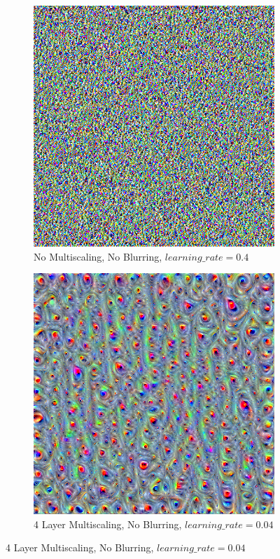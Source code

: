 \begin{figure}
    \captionsetup{justification=centering}
    
    \begin{subfigure}[t]{0.31\textwidth}
        \captionsetup{justification=centering}
        \centering
        \includegraphics[width=.7\linewidth]{figuras/feat_vis/experiments/intermediary/l6/random_image_pl1_lr4e-1_layer12_no-blur.png}
        \caption{No Multiscaling, No Blurring, \(learning\_rate = 0.4\)}
    \end{subfigure}
    \hfill
    \begin{subfigure}[t]{0.31\textwidth}
        \captionsetup{justification=centering}
        \centering
        \includegraphics[width=.7\linewidth]{figuras/feat_vis/experiments/intermediary/l6/random_image_pl4_lr4e-2_layer12_no-blur.png}
        \caption{4 Layer Multiscaling, No Blurring, \(learning\_rate = 0.04\)}

\end{subfigure}
\end{figure}
